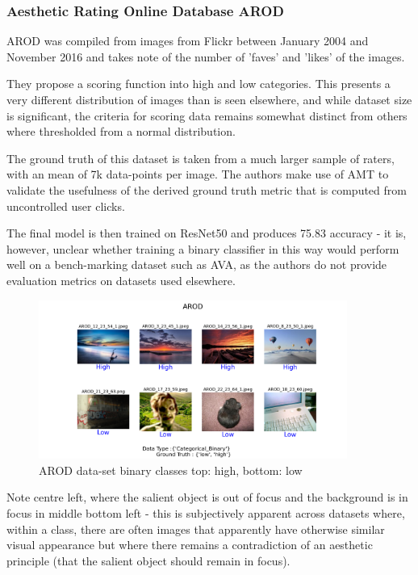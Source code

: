\subsubsection{Aesthetic Rating Online Database AROD}


AROD was compiled from images from Flickr between January 2004 and November 2016\cite[3]{Schwarz2018a} and takes note of the number of 'faves' and 'likes' of the images. 

They propose a scoring function into high and low categories. This presents a very different distribution of images than is seen elsewhere, and while dataset size is significant, the criteria for scoring data remains somewhat distinct from others where thresholded from a normal distribution. 

The  ground truth of this dataset is taken from a much larger sample of raters, with an mean of 7k data-points per image. The authors make use of AMT to validate the usefulness of the derived ground truth metric that is computed from uncontrolled user clicks. 

The final model is then trained on ResNet50 and produces 75.83 accuracy - it is, however, unclear whether training a binary classifier in this way would perform well on a bench-marking dataset such as AVA, as the authors do not provide evaluation metrics on datasets used elsewhere.
 

\begin{figure}[htp]
\centering
\includegraphics[width=0.9\textwidth]{figures/database_ims/AROD.png}
  \caption{\label{fig:AROD} AROD data-set binary classes top: high, bottom: low}
  \label{fig:AROD_}
\end{figure}

Note centre left, where the salient object is out of focus and the background is in focus in middle bottom left - this is subjectively apparent across datasets where, within a class, there are often images that apparently have otherwise similar visual appearance but where there remains a contradiction of an aesthetic principle (that the salient object should remain in focus).\\\


